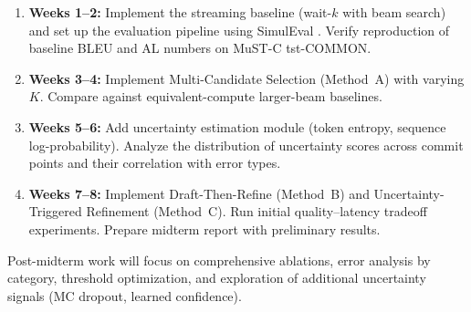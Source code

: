 \begin{enumerate}[leftmargin=*, itemsep=4pt]
    \item \textbf{Weeks 1--2:} Implement the streaming baseline (wait-$k$ with beam search) and set up the evaluation pipeline using SimulEval \citep{ma2020simuleval}. Verify reproduction of baseline BLEU and AL numbers on MuST-C tst-COMMON.

    \item \textbf{Weeks 3--4:} Implement Multi-Candidate Selection (Method~A) with varying $K$. Compare against equivalent-compute larger-beam baselines.

    \item \textbf{Weeks 5--6:} Add uncertainty estimation module (token entropy, sequence log-probability). Analyze the distribution of uncertainty scores across commit points and their correlation with error types.

    \item \textbf{Weeks 7--8:} Implement Draft-Then-Refine (Method~B) and Uncertainty-Triggered Refinement (Method~C). Run initial quality--latency tradeoff experiments. Prepare midterm report with preliminary results.
\end{enumerate}

Post-midterm work will focus on comprehensive ablations, error analysis by category, threshold optimization, and exploration of additional uncertainty signals (MC dropout, learned confidence).
